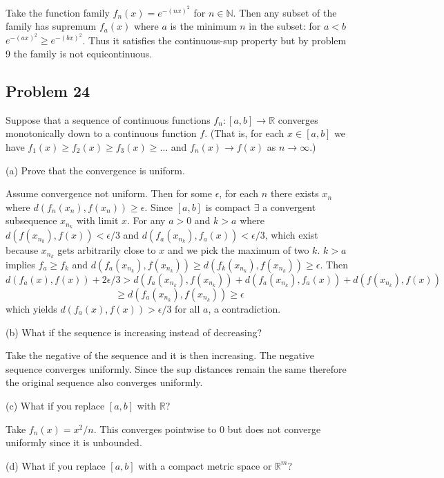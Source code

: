 \documentclass{amsart}
\begin{document}
\medskip Take the function family $f_n(x)=e^{-(nx)^2}$ for $n\in\mathbb{N}$. Then any subset of the family has supremum
$f_a(x)$ where $a$ is the minimum $n$ in the subset: for $a<b$ $e^{-(ax)^2}\geq e^{-(bx)^2}$. Thus it satisfies
the continuous-sup property but by problem 9 the family is not equicontinuous.

\newpage

\subsection*{Problem 24} Suppose that a sequence of continuous functions \( f_n : [a, b] \to \mathbb{R} \) converges monotonically down to a continuous function \( f \). (That is, for each \( x \in [a, b] \) we have \( f_1(x) \geq f_2(x) \geq f_3(x) \geq \dots \) and \( f_n(x) \to f(x) \) as \( n \to \infty \).)
    
(a) Prove that the convergence is uniform.

\medskip \noindent Assume convergence not uniform. Then for some $\epsilon$, for each $n$ there exists $x_n$ where $d(f_n(x_n), f(x_n))\geq \epsilon$.
Since $[a,b]$ is compact $\exists$ a convergent subsequence $x_{n_k}$ with limit $x$. For any $a>0$ and $k>a$ where
$d(f(x_{n_k}), f(x))<\epsilon/3$ and $d(f_a(x_{n_k}), f_a(x))<\epsilon/3$, which exist because $x_{n_k}$ gets
arbitrarily close to $x$ and we pick the maximum of two $k$. $k>a$ implies $f_a\geq f_k$ and $d(f_a(x_{n_k}),f(x_{n_k}))\geq d(f_k(x_{n_k}), f(x_{n_k})) \geq \epsilon$. 
Then \[d(f_a(x), f(x))+2\epsilon/3 > d(f_a(x_{n_k}), f(x_{n_k}))+d(f_a(x_{n_k}), f_a(x))+d(f(x_{n_k}), f(x))\]
\[\geq d(f_a(x_{n_k}),f(x_{n_k}))\geq \epsilon\] which yields $d(f_a(x), f(x))>\epsilon/3$ for all $a$, a contradiction.

(b) What if the sequence is increasing instead of decreasing?

\medskip \noindent Take the negative of the sequence and it is then increasing. The negative sequence
converges uniformly. Since the sup distances remain the same therefore the original sequence also converges
uniformly.

\bigskip

(c) What if you replace \( [a, b] \) with \( \mathbb{R} \)?

\medskip \noindent Take $f_n(x) = x^2/n$. This converges pointwise to $0$ but does not converge uniformly since
it is unbounded.

\bigskip

(d) What if you replace \( [a, b] \) with a compact metric space or \( \mathbb{R}^m \)?
\end{document}
